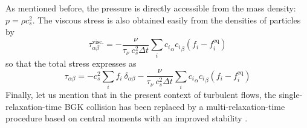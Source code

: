 \documentclass{jfm}
\begin{document}
As mentioned before, the pressure is directly accessible from the mass density: $p = \rho c_s^2$. The viscous stress is also obtained easily from the densities of particles by
\[
\tau^\mathrm{visc.}_{\alpha \beta} = -\frac{\nu}{\tau_\nu ~ c_s^2 \Delta t} \sum_i  {c_i}_\alpha {c_i}_\beta (f_i - f_i^\mathrm{eq})
\]
so that the total stress expresses as
\begin{equation}\label{eq:def_stress}
\tau_{\alpha \beta} = -  c_s^2 \sum_i f_i ~ \delta_{\alpha\beta}  - \frac{\nu}{\tau_\nu ~ c_s^2 \Delta t} \sum_i  {c_i}_\alpha {c_i}_\beta (f_i - f_i^\mathrm{eq})
\end{equation}
Finally, let us mention that in the present context of turbulent flows, the single-relaxation-time BGK collision has been replaced by a multi-relaxation-time procedure based on central moments with an improved stability \citep{De_Rosis_2016}.
\end{document}
